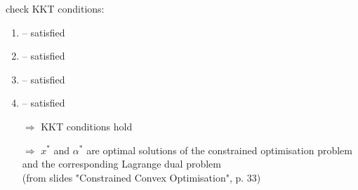 check KKT conditions:

\begin{enumerate}
\item{ -- satisfied}
\item{ -- satisfied}
\item{ -- satisfied}
\item{ -- satisfied}
\end{enumerate}

\begin{itemize}
\item[$\Rightarrow$]{KKT conditions hold}
\item[$\Rightarrow$]{$x^*$ and $\alpha^*$ are optimal solutions of the constrained optimisation problem and the corresponding Lagrange dual problem \\(from slides "Constrained Convex Optimisation", p. 33)}
\end{itemize}


